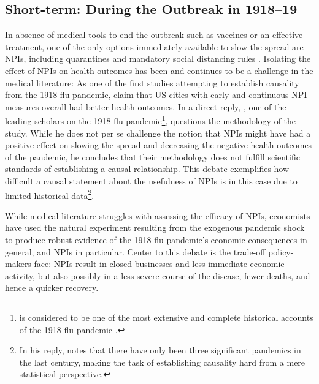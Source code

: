 \documentclass[12pt,a4paper]{article}
\begin{document}
	\subsection{Short-term: During the Outbreak in 1918--19} \label{subsec:short}

In absence of medical tools to end the outbreak such as vaccines or an effective treatment, one of the only options  immediately available to slow the spread are NPIs, including quarantines and mandatory social distancing rules \citep{aledortNonpharmaceuticalPublicHealth2007}.
Isolating the effect of NPIs on health outcomes has been and continues to be a challenge in the medical literature:
As one of the first studies attempting to establish causality from the 1918 flu pandemic, \cite{markelNonpharmaceuticalInterventionsImplemented2007} claim that US cities with early and continuous NPI measures overall had better health outcomes.
In a direct reply, \cite{barryCommentsNonpharmaceuticalInterventions2007}, one of the leading scholars on the 1918 flu pandemic\footnote{
	\cite{barryGreatInfluenzaEpic2005} is considered to be one of the most extensive and complete historical accounts of the 1918 flu pandemic \citep[see comment by the editor]{barryCommentsNonpharmaceuticalInterventions2007}.}, questions the methodology of the study.
While he does not per se challenge the notion that NPIs might have had a positive effect on slowing the spread and decreasing the negative health outcomes of the pandemic, he concludes that their methodology does not fulfill scientific standards of establishing a causal relationship.
This debate exemplifies how difficult a causal statement about the usefulness of NPIs is in this case due to limited historical data\footnote{In his reply, \cite{barryCommentsNonpharmaceuticalInterventions2007} notes that there have only been three significant pandemics in the last century, making the task of establishing causality hard from a mere statistical perspective.}.

While medical literature struggles with assessing the efficacy of NPIs, economists have used the natural experiment resulting from the exogenous pandemic shock to produce robust evidence of the 1918 flu pandemic's economic consequences in general, and NPIs in particular.
Center to this debate is the trade-off policy-makers face: NPIs result in closed businesses and less immediate economic activity, but also possibly in a less severe course of the disease, fewer deaths, and hence a quicker recovery.
\end{document}
